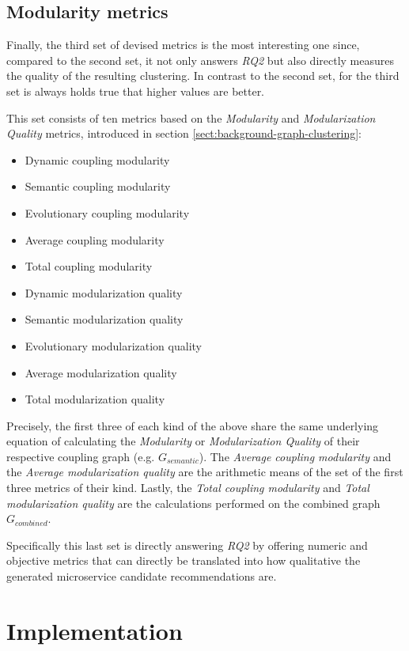 \documentclass[12pt,a4paper]{report}
\begin{document}
\section{Modularity metrics}

Finally, the third set of devised metrics is the most interesting one since,
compared to the second set, it not only answers \textit{RQ2} but also directly
measures the quality of the resulting clustering.
In contrast to the second set, for the third set is always holds true that
higher values are better.

This set consists of ten metrics based on the \textit{Modularity} and
\textit{Modularization Quality} metrics, introduced in section
\ref{sect:background-graph-clustering}:
\begin{itemize}[noitemsep]
  \item Dynamic coupling modularity
  \item Semantic coupling modularity
  \item Evolutionary coupling modularity
  \item Average coupling modularity
  \item Total coupling modularity
  \item Dynamic modularization quality
  \item Semantic modularization quality
  \item Evolutionary modularization quality
  \item Average modularization quality
  \item Total modularization quality
\end{itemize}
Precisely, the first three of each kind of the above share the same underlying
equation of calculating the \textit{Modularity} or \textit{Modularization Quality}
of their respective coupling graph (e.g. \(G_{semantic}\)).
The \textit{Average coupling modularity} and the \textit{Average modularization quality}
are the arithmetic means of the set of the first three metrics of their kind.
Lastly, the \textit{Total coupling modularity} and \textit{Total modularization quality}
are the calculations performed on the combined graph \(G_{combined}\).

Specifically this last set is directly answering \textit{RQ2} by offering
numeric and objective metrics that can directly be translated into how
qualitative the generated microservice candidate recommendations are.




\chapter{Implementation} \label{chap:implementation}
\end{document}
